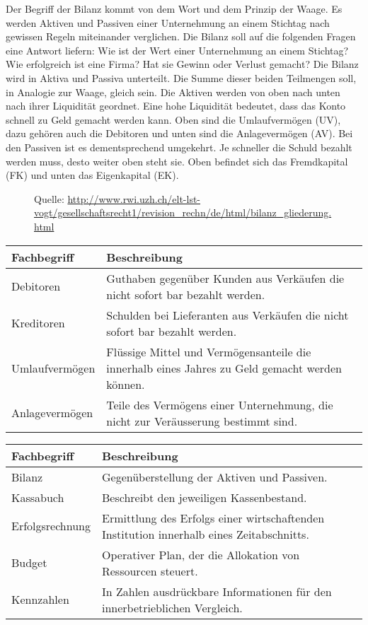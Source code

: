 \documentclass[11pt, twocolumn, a4paper]{scrartcl}
\begin{document}
Der Begriff der Bilanz kommt von dem Wort und dem Prinzip der Waage. Es werden Aktiven und Passiven einer Unternehmung an einem Stichtag nach gewissen Regeln miteinander verglichen. 
Die Bilanz soll auf die folgenden Fragen eine Antwort liefern: Wie ist der Wert einer Unternehmung an einem Stichtag? Wie erfolgreich ist eine Firma? Hat sie Gewinn oder Verlust gemacht? Die Bilanz wird in Aktiva und Passiva unterteilt. Die Summe dieser beiden Teilmengen soll, in Analogie zur Waage, gleich sein. Die Aktiven werden von oben nach unten nach ihrer Liquidität geordnet. Eine hohe Liquidität bedeutet, dass das Konto schnell zu Geld gemacht werden kann. Oben sind die Umlaufvermögen (UV), dazu gehören auch die Debitoren und unten sind die Anlagevermögen (AV). Bei den Passiven ist es dementsprechend umgekehrt. Je schneller die Schuld bezahlt werden muss, desto weiter oben steht sie. Oben befindet sich das Fremdkapital (FK) und unten das Eigenkapital (EK). 

\begin{figure}
\caption{Quelle: \protect\url{http://www.rwi.uzh.ch/elt-lst-vogt/gesellschaftsrecht1/revision_rechn/de/html/bilanz_gliederung.html}}
\end{figure}


\begin{tabular}{p{3cm}p{3cm}}
\toprule
\textbf{Fachbegriff} & \textbf{Beschreibung} \\
\midrule
Debitoren&Guthaben gegenüber Kunden aus Verkäufen die nicht sofort bar bezahlt werden.\\
\midrule
Kreditoren&Schulden bei Lieferanten aus Verkäufen die nicht sofort bar bezahlt werden.\\
\midrule
Umlaufvermögen& Flüssige Mittel und Vermögensanteile die innerhalb eines Jahres zu Geld gemacht werden können.\\
\midrule
Anlagevermögen&Teile des Vermögens einer Unternehmung, die nicht zur Veräusserung bestimmt sind.\\
\bottomrule
\end{tabular}

\begin{tabular}{p{3cm}p{3cm}}
\toprule
\textbf{Fachbegriff} & \textbf{Beschreibung} \\
\midrule
Bilanz&Gegenüberstellung der Aktiven und Passiven.\\
\midrule
Kassabuch&Beschreibt den jeweiligen Kassenbestand.\\
\midrule
Erfolgsrechnung&Ermittlung des Erfolgs einer wirtschaftenden Institution innerhalb eines Zeitabschnitts.\\
\midrule
Budget&Operativer Plan, der die Allokation von Ressourcen steuert.\\
\midrule
Kennzahlen&In Zahlen ausdrückbare Informationen für den innerbetrieblichen Vergleich.\\
\bottomrule

\end{tabular}
\end{document}
